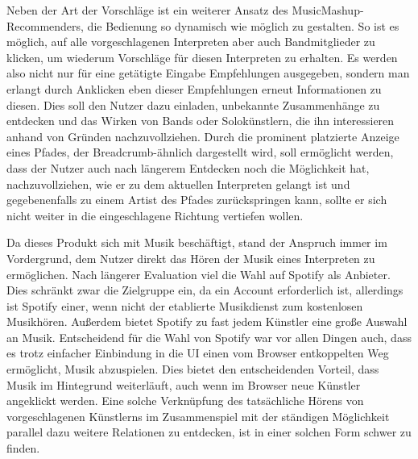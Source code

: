 Neben der Art der Vorschläge ist ein weiterer Ansatz des MusicMashup-Recommenders, die Bedienung so dynamisch wie möglich zu gestalten. So ist es möglich, auf alle vorgeschlagenen Interpreten aber auch Bandmitglieder zu klicken, um wiederum Vorschläge für diesen Interpreten zu erhalten. Es werden also nicht nur für eine getätigte Eingabe Empfehlungen ausgegeben, sondern man erlangt durch Anklicken eben dieser Empfehlungen erneut Informationen zu diesen. Dies soll den Nutzer dazu einladen, unbekannte Zusammenhänge zu entdecken und das Wirken von Bands oder Solokünstlern, die ihn interessieren anhand von Gründen nachzuvollziehen. Durch die prominent platzierte Anzeige eines Pfades, der Breadcrumb-ähnlich dargestellt wird, soll ermöglicht werden, dass der Nutzer auch nach längerem Entdecken noch die Möglichkeit hat, nachzuvollziehen, wie er zu dem aktuellen Interpreten gelangt ist und gegebenenfalls zu einem Artist des Pfades zurückspringen kann, sollte er sich nicht weiter in die eingeschlagene Richtung vertiefen wollen.

Da dieses Produkt sich mit Musik beschäftigt, stand der Anspruch immer im Vordergrund, dem Nutzer direkt das Hören der Musik eines Interpreten zu ermöglichen. Nach längerer Evaluation viel die Wahl auf Spotify als Anbieter. Dies schränkt zwar die Zielgruppe ein, da ein Account erforderlich ist, allerdings ist Spotify einer, wenn nicht der etablierte Musikdienst zum kostenlosen Musikhören. Außerdem bietet Spotify zu fast jedem Künstler eine große Auswahl an Musik. Entscheidend für die Wahl von Spotify war vor allen Dingen auch, dass es trotz einfacher Einbindung in die UI einen vom Browser entkoppelten Weg ermöglicht, Musik abzuspielen. Dies bietet den entscheidenden Vorteil, dass Musik im Hintegrund weiterläuft, auch wenn im Browser neue Künstler angeklickt werden. Eine solche Verknüpfung des tatsächliche Hörens von vorgeschlagenen Künstlerns im Zusammenspiel mit der ständigen Möglichkeit parallel dazu weitere Relationen zu entdecken, ist in einer solchen Form schwer zu finden.



